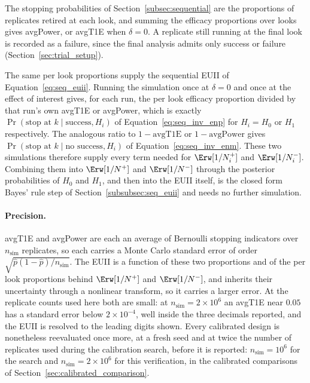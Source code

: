 The stopping probabilities of Section~\ref{subsec:sequential} are the proportions of replicates retired at each
look, and summing the efficacy proportions over looks gives avgPower, or avgT1E when $\delta = 0$. A
replicate still running at the final look is recorded as a failure, since the final analysis admits only
success or failure (Section~\ref{sec:trial_setup}).

The same per look proportions supply the sequential EUII of Equation~\eqref{eq:seq_euii}. Running the simulation
once at $\delta = 0$ and once at the effect of interest gives, for each run, the per look efficacy proportion
divided by that run's own avgT1E or avgPower, which is exactly $\Pr(\text{stop at } k \mid \text{success}, H_i)$
of Equation~\eqref{eq:seq_inv_enp} for $H_i = H_0$ or $H_1$ respectively. The analogous ratio to
$1 - \text{avgT1E}$ or $1 - \text{avgPower}$ gives $\Pr(\text{stop at } k \mid \text{no success}, H_i)$ of
Equation~\eqref{eq:seq_inv_enm}. These two simulations therefore supply every term needed for
$\Erw[1/N_i^+]$ and $\Erw[1/N_i^-]$. Combining them into $\Erw[1/N^+]$ and $\Erw[1/N^-]$ through the
posterior probabilities of $H_0$ and $H_1$, and then into the EUII itself, is the closed form Bayes' rule
step of Section~\ref{subsubsec:seq_euii} and needs no further simulation.

\paragraph{Precision.} avgT1E and avgPower are each an average of Bernoulli stopping indicators over
$n_{\text{sim}}$ replicates, so each carries a Monte Carlo standard error of order
$\sqrt{\hat{p}(1-\hat{p})/n_{\text{sim}}}$. The EUII is a function of these two proportions and of the per
look proportions behind $\Erw[1/N^+]$ and $\Erw[1/N^-]$, and inherits their uncertainty through a nonlinear
transform, so it carries a larger error. At the replicate counts used here both are small: at
$n_{\text{sim}} = 2 \times 10^6$ an avgT1E near $0.05$ has a standard error below $2 \times 10^{-4}$, well
inside the three decimals reported, and the EUII is resolved to the leading digits shown. Every calibrated
design is nonetheless reevaluated once more, at a fresh seed and at twice the number of replicates used during
the calibration search, before it is reported: $n_{\text{sim}} = 10^6$ for the search and
$n_{\text{sim}} = 2 \times 10^6$ for this verification, in the calibrated comparisons of
Section~\ref{sec:calibrated_comparison}.
